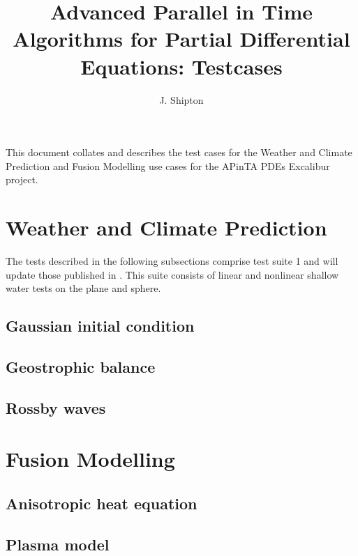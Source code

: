 \documentclass{article}
\title{Advanced Parallel in Time Algorithms for Partial Differential Equations: Testcases}
\author{J. Shipton}
\begin{document}
\maketitle

This document collates and describes the test cases for the Weather
and Climate Prediction and Fusion Modelling use cases for the APinTA
PDEs Excalibur project.

\section*{Weather and Climate Prediction}

The tests described in the following subsections comprise test suite 1
and will update those published in
\citet{williamson1992standard}. This suite consists of linear and
nonlinear shallow water tests on the plane and sphere.

\subsection{Gaussian initial condition}

\subsection{Geostrophic balance}

\subsection{Rossby waves}

\section*{Fusion Modelling}

\subsection{Anisotropic heat equation}

\subsection{Plasma model}



\end{document}
